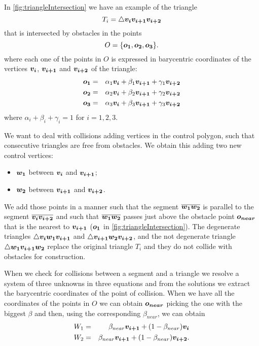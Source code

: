 \documentclass[dissertation.tex]{subfiles}
\begin{document}
In \cref{fig:triangleIntersection} we have an example of the triangle
\begin{equation*}
  T_i = \triangle \boldsymbol{v_i}\boldsymbol{v_{i+1}}\boldsymbol{v_{i+2}} 
\end{equation*}
that is
intersected by obstacles in the points
\begin{equation*}
  O = \{\boldsymbol{o_1},\boldsymbol{o_2},\boldsymbol{o_3}\}.
\end{equation*}
where each one of the points in $O$ is expressed in barycentric
coordinates of the vertices $\boldsymbol{v_i}$, $\boldsymbol{v_{i+1}}$ and $\boldsymbol{v_{i+2}}$ of the
triangle:
\begin{eqnarray*}
  \boldsymbol{o_1}&=&\alpha_1 \boldsymbol{v_i}+\beta_1 \boldsymbol{v_{i+1}}+\gamma_1 \boldsymbol{v_{i+2}}\\
  \boldsymbol{o_2}&=&\alpha_2 \boldsymbol{v_i}+\beta_2 \boldsymbol{v_{i+1}}+\gamma_2 \boldsymbol{v_{i+2}}\\
  \boldsymbol{o_3}&=&\alpha_3 \boldsymbol{v_i}+\beta_3 \boldsymbol{v_{i+1}}+\gamma_3 \boldsymbol{v_{i+2}}
\end{eqnarray*}
where $\alpha_i+\beta_i+\gamma_i=1$ for $i=1,2,3$.

We want to deal with collisions adding vertices in the control
polygon, such that consecutive triangles are free from obstacles. We
obtain this adding two new control vertices: 
\begin{itemize}
\item $\boldsymbol{w_1}$ between $\boldsymbol{v_i}$ and $\boldsymbol{v_{i+1}}$;
\item $\boldsymbol{w_2}$ between $\boldsymbol{v_{i+1}}$ and $\boldsymbol{v_{i+2}}$.
\end{itemize}
We add those
points in a manner such that the segment $\overline{\boldsymbol{w_1}\boldsymbol{w_2}}$ is
parallel to the segment $\overline{\boldsymbol{v_i}\boldsymbol{v_{i+2}}}$ and such that
$\overline{\boldsymbol{w_1}\boldsymbol{w_2}}$ passes just above the obstacle point
$\boldsymbol{o_{near}}$ that is the nearest
to $\boldsymbol{v_{i+1}}$ ($\boldsymbol{o_1}$ in
\cref{fig:triangleIntersection}). The degenerate triangles $\triangle \boldsymbol{v_i}\boldsymbol{w_1}\boldsymbol{v_{i+1}}$ and $\triangle
\boldsymbol{v_{i+1}}\boldsymbol{w_2}\boldsymbol{v_{i+2}}$, and the not degenerate triangle
$\triangle \boldsymbol{w_1}\boldsymbol{v_{i+1}}\boldsymbol{w_2}$ replace the original triangle
$T_i$ and they do not collide with obstacles for construction.

When we check for collisions between a segment and a triangle we
resolve a system of three unknowns in
three equations and from the solutions we extract the barycentric
coordinates of
the point of collision. When we have all the coordinates of the points
in $O$ we can obtain $\boldsymbol{o_{near}}$ picking the one with the biggest $\beta$
and then, using the corresponding $\beta_{near}$, we can obtain
\begin{eqnarray*}
  W_1&=&\beta_{near} \boldsymbol{v_{i+1}}+(1-\beta_{near})\boldsymbol{v_i}\\
  W_2&=&\beta_{near} \boldsymbol{v_{i+1}}+(1-\beta_{near})\boldsymbol{v_{i+2}}.
\end{eqnarray*}
\end{document}
